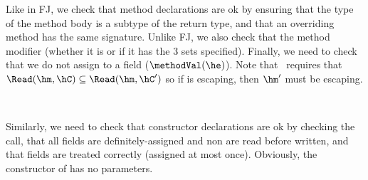 \documentclass[9pt,a4paper]{article}
\begin{document}
Like in FJ, we check that method declarations are ok by ensuring that the type of the method body is a subtype
    of the return type, and that an overriding method has the same signature.
Unlike FJ, we also check that the method modifier (whether it is \hescaping or if it has the 3 sets specified).
Finally, we need to check that we do not assign to a \hval field ($\methodVal(\he)$).
Note that~ requires that~$\Read(\hm,\hC) \subseteq \Read(\hm,\hC')$
    so if \hm is escaping, then $\hm'$ must be escaping.

\beqst %
~
\eeq

Similarly, we need to check that constructor declarations are ok by checking the \hsuper call,
    that all fields are definitely-assigned and non are read before written,
    and that \hval fields are treated correctly (assigned at most once).
Obviously, the constructor of \hObject has no parameters.

\beqst %
\gap {}
\eeq
\end{document}
